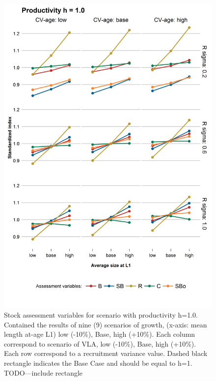 \documentclass[11pt,letter,]{article}
\begin{document}
\begin{figure}[hbtp]
	\begin{center}
\includegraphics[width=0.70\columnwidth]{figures/steepness-10-estado.png}
  \end{center}
\caption{Stock assessment variables for scenario with productivity h=1.0. Contained the results of nine (9) scenarios of growth, (x-axis: mean length at-age L1) low (-10\%), Base, high (+10\%). Each column correspond to scenario of VLA, low (-10\%), Base, high (+10\%). Each row correspond to a recruitment variance value. Dashed black rectangle indicates the Base Case and should be equal to h=1. TODO---include rectangle}
\label{figure1}
\end{figure}
\end{document}
